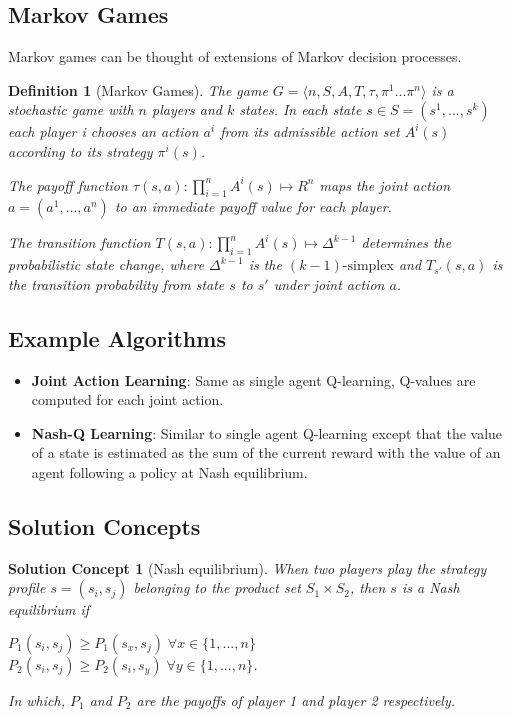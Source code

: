 \documentclass[twocolumn]{article}
\theoremstyle{plain}
\newtheorem{definition}{Definition}[section]
\begin{document}
\subsection{Markov Games}

Markov games can be thought of extensions of Markov decision processes.

\begin{definition}[Markov Games]
    The game $G = \langle n, S, A, T, \tau, \pi^1 ... \pi^n \rangle$ is a stochastic game with $n$ players and $k$ states. In each state $s \in S = (s^1, ..., s^k)$ each player i chooses an action $a^i$ from its admissible action set $A^i(s)$ according to its strategy $\pi^i(s)$.


    The payoff function $\tau(s,a):\prod^{n}_{i=1}A^i(s) \mapsto R^n$ maps the joint action $a = (a^1, ..., a^n)$ to an immediate payoff value for each player.

    The transition function $T(s,a):\prod^n_{i=1}A^i(s) \mapsto \Delta^{k-1}$ determines the probabilistic state change, where $\Delta^{k-1}$ is the $(k-1)\text{-simplex}$ and $T_{s'}(s,a)$ is the transition probability from state $s$ to $s'$ under joint action $a$.
\end{definition}

\subsection{Example Algorithms}

\begin{itemize}
    \item \textbf{Joint Action Learning}: Same as single agent Q-learning, Q-values are computed for each joint action.
    \item \textbf{Nash-Q Learning}: Similar to single agent Q-learning except that the value of a state is estimated as the sum of the current reward with the value of an agent following a policy at Nash equilibrium.
\end{itemize}

\subsection{Solution Concepts}

\newtheorem{concept}{Solution Concept}[section]
\begin{concept}[Nash equilibrium]
    When two players play the strategy profile $s = (s_i,s_j)$ belonging to the product set $S_1 \times S_2$, then $s$ is a Nash equilibrium if \\
    \begin{center}
        $P_1(s_i,s_j) \geq P_1(s_x, s_j) \; \forall x \in \{1,...,n\}$ \\
        $P_2(s_i,s_j) \geq P_2(s_i, s_y) \; \forall y \in \{1,...,n\}$.
    \end{center}

    In which, $P_1$ and $P_2$ are the payoffs of player 1 and player 2 respectively.
\end{concept}
\end{document}
